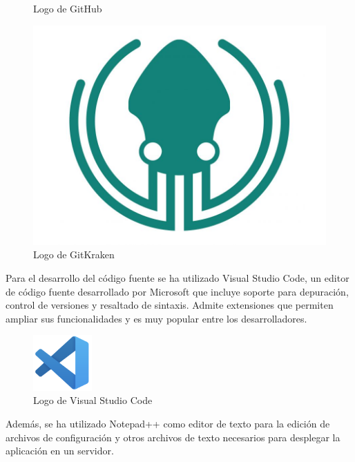 \begin{figure}[H]
\begin{minipage}{0.2\textwidth}
        \caption{Logo de GitHub}
    \end{minipage}
    \hfill
    \begin{minipage}{0.3\textwidth}
        \centering
        \includegraphics[width=\textwidth]{figures/7-Construccion/GitKraken.jpeg}
        \caption{Logo de GitKraken}
    \end{minipage}
\end{figure}

Para el desarrollo del código fuente se ha utilizado Visual Studio Code\cite{vscode}, 
un editor de código fuente desarrollado por Microsoft que incluye soporte para depuración, control de versiones y resaltado de sintaxis.
Admite extensiones que permiten ampliar sus funcionalidades y es muy popular entre los desarrolladores.

\begin{figure}[H]
    \centering
    \includegraphics[width=0.2\textwidth]{figures/7-Construccion/VSCode.png}
    \caption{Logo de Visual Studio Code}
\end{figure}

Además, se ha utilizado Notepad++\cite{notepad++} como editor de texto para la edición de archivos de configuración y otros archivos de texto
necesarios para desplegar la aplicación en un servidor.

